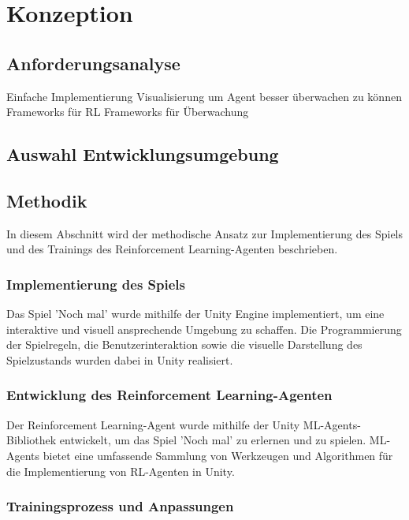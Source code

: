 
\clearpage
\chapter{Konzeption}

\section{Anforderungsanalyse}
Einfache Implementierung
Visualisierung um Agent besser überwachen zu können
Frameworks für RL 
Frameworks für Überwachung

\section{Auswahl Entwicklungsumgebung}

\section{Methodik}

In diesem Abschnitt wird der methodische Ansatz zur Implementierung des Spiels und des Trainings des Reinforcement Learning-Agenten beschrieben.


\subsection{Implementierung des Spiels}

Das Spiel 'Noch mal' wurde mithilfe der Unity Engine implementiert, um eine interaktive und visuell ansprechende Umgebung zu schaffen. Die Programmierung der Spielregeln, die Benutzerinteraktion sowie die visuelle Darstellung des Spielzustands wurden dabei in Unity realisiert.

\subsection{Entwicklung des Reinforcement Learning-Agenten}

Der Reinforcement Learning-Agent wurde mithilfe der Unity ML-Agents-Bibliothek entwickelt, um das Spiel 'Noch mal' zu erlernen und zu spielen. ML-Agents bietet eine umfassende Sammlung von Werkzeugen und Algorithmen für die Implementierung von RL-Agenten in Unity.

\subsection{Trainingsprozess und Anpassungen}

